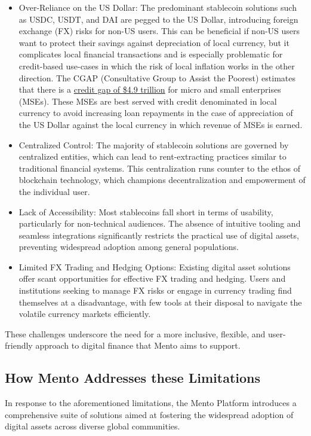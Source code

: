 \documentclass[a4paper]{article}
\theoremstyle{definition}
\begin{document}
\begin{itemize}
    \item Over-Reliance on the US Dollar: The predominant stablecoin solutions such as USDC, USDT, and DAI are pegged to the US Dollar, introducing foreign exchange (FX) risks for non-US users. This can be beneficial if non-US users want to protect their savings against depreciation of local currency, but it complicates local financial transactions and is especially problematic for credit-based use-cases in which the risk of local inflation works in the other direction. The CGAP (Consultative Group to Assist the Poorest) estimates that there is a \href{https://www.cgap.org/blog/49-trillion-small-business-credit-gap-digital-models-to-rescue}{credit gap of \$4.9 trillion} for micro and small enterprises (MSEs). These MSEs are best served with credit denominated in local currency to avoid increasing loan repayments in the case of appreciation of the US Dollar against the local currency in which revenue of MSEs is earned. 
    
    \item Centralized Control: The majority of stablecoin solutions are governed by centralized entities, which can lead to rent-extracting practices similar to traditional financial systems. This centralization runs counter to the ethos of blockchain technology, which champions decentralization and empowerment of the individual user.
    
    \item Lack of Accessibility: Most stablecoins fall short in terms of usability, particularly for non-technical audiences. The absence of intuitive tooling and seamless integrations significantly restricts the practical use of digital assets, preventing widespread adoption among general populations.
    
    \item Limited FX Trading and Hedging Options: Existing digital asset solutions offer scant opportunities for effective FX trading and hedging. Users and institutions seeking to manage FX risks or engage in currency trading find themselves at a disadvantage, with few tools at their disposal to navigate the volatile currency markets efficiently.
\end{itemize}

These challenges underscore the need for a more inclusive, flexible, and user-friendly approach to digital finance that Mento aims to support. 

\subsection{How Mento Addresses these Limitations}
In response to the aforementioned limitations, the Mento Platform introduces a comprehensive suite of solutions aimed at fostering the widespread adoption of digital assets across diverse global communities.
\end{document}
